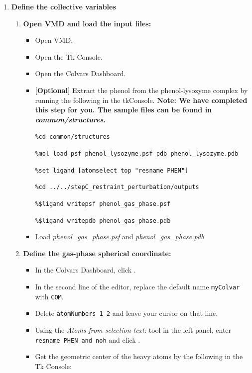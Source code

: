 \documentclass[9pt,tutorial,pubversion]{Styling/livecoms}
\newcommand{\tkconsole}[1]{\texttt{\%#1}}
\newcommand{\filepath}[1]{\textit{#1}}
\newcommand{\button}[1]{\inlineBox[gray]{\texttt{#1}}}
\newcommand{\menu}[1]{\textit{#1}}
\newcommand{\textInput}[1]{\texttt{#1}}
\begin{document}
    \begin{enumerate}%
    
        \item \textbf{Define the collective variables}
        \begin{enumerate}[label=\alph*., ref=\theenumi.\alph*]
            \item \textbf{Open VMD and load the input files:}
            \begin{itemize}
                \item Open VMD.
                \item Open the Tk Console.
                \item Open the Colvars Dashboard.
                \item \textbf{[Optional]} Extract the phenol from the phenol-lysozyme complex by running the following in the tkConsole. \textbf{Note: We have completed this step for you. The sample files can be found in \filepath{common/structures}.}
            
                \tkconsole{cd common/structures}
                
                \tkconsole{mol load psf phenol\_lysozyme.psf pdb phenol\_lysozyme.pdb}
                
                \tkconsole{set ligand [atomselect top "resname PHEN"]}
                
                \tkconsole{cd ../../stepC\_restraint\_perturbation/outputs}
                
                \tkconsole{\$ligand writepsf phenol\_gas\_phase.psf}
                
                \tkconsole{\$ligand writepdb phenol\_gas\_phase.pdb}
                
                \item Load \filepath{phenol\_gas\_phase.psf} and \filepath{phenol\_gas\_phase.pdb}
                
                \end{itemize}

            \item \textbf{Define the gas-phase spherical coordinate:} \label{step:defineGasRestraints}
            \begin{itemize}
                \item In the Colvars Dashboard, click \button{New [Ctrl-n]}.
                \item In the second line of the editor, replace the default name \textInput{myColvar} with \textInput{COM}.
                \item Delete \textInput{atomNumbers 1 2} and leave your cursor on that line.
                \item Using the \menu{Atoms from selection text:} tool in the left panel, enter \textInput{resname PHEN and noh} and click \button{Insert [Enter]}.
                \item Get the geometric center of the heavy atoms by  the following in the Tk Console:
                

\end{itemize}
\end{enumerate}
\end{enumerate}
\end{document}
